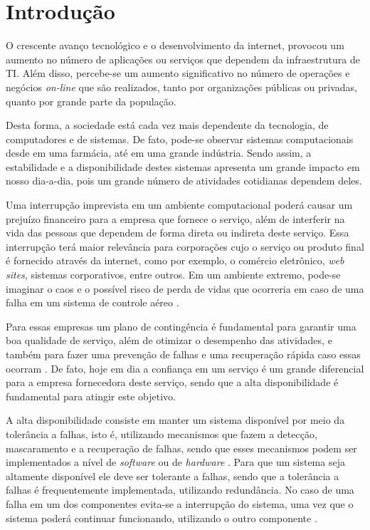 \chapter{Introdução}
O crescente avanço tecnológico e o desenvolvimento da internet, provocou um aumento no número de aplicações ou serviços que dependem da 
infraestrutura de \ac{TI}. Além disso, percebe-se um aumento significativo no número de operações e negócios \textit{on-line} que são realizados, 
tanto por organizações públicas ou privadas, quanto por grande parte da população.

Desta forma, a sociedade está cada vez mais dependente da tecnologia, de computadores e de sistemas. De fato, pode-se observar 
sistemas computacionais desde em uma farmácia, até em uma grande indústria. Sendo assim, a estabilidade e a disponibilidade destes 
sistemas apresenta um grande impacto em nosso dia-a-dia, pois um grande número de atividades cotidianas dependem deles.

Uma interrupção imprevista em um ambiente computacional poderá causar um prejuízo financeiro para a empresa que fornece o serviço, 
além de interferir na vida das pessoas que dependem de forma direta ou indireta deste serviço. 
Essa interrupção terá maior relevância para corporações cujo o serviço ou produto final é fornecido através da internet, 
como por exemplo, o comércio eletrônico, \textit{web sites}, sistemas corporativos, entre outros. 
Em um ambiente extremo, pode-se imaginar o caos e o possível risco de perda de vidas que ocorreria em caso de uma falha 
em um sistema de controle aéreo \cite{costa2009}.

Para essas empresas um plano de contingência é fundamental para garantir uma boa qualidade de serviço, além de otimizar o desempenho 
das atividades, e também para fazer uma prevenção de falhas e uma recuperação rápida caso essas ocorram \cite{costa2009}.
De fato, hoje em dia a confiança em um serviço é um grande diferencial para a empresa fornecedora deste serviço, 
sendo que a alta disponibilidade é fundamental para atingir este objetivo.

A alta disponibilidade consiste em manter um sistema disponível por meio da tolerância a falhas, isto é, utilizando mecanismos que fazem a 
detecção, mascaramento e a recuperação de falhas, sendo que esses mecanismos podem ser implementados a nível de \textit{software} ou de 
\textit{hardware} \cite{reis2009}. Para que um sistema seja altamente disponível ele deve ser tolerante a falhas, sendo que a tolerância
a falhas é frequentemente implementada, utilizando redundância. No caso de uma falha em um dos componentes evita-se a interrupção do sistema,
uma vez que o sistema poderá continuar funcionando, utilizando o outro componente \cite{batista2007}.

